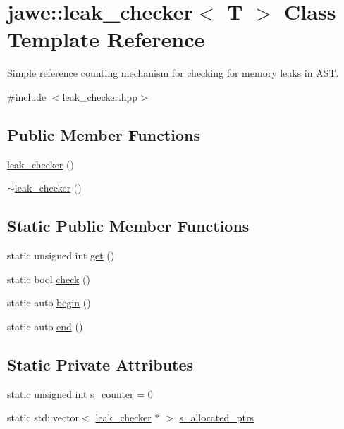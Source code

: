 \hypertarget{classjawe_1_1leak__checker}{}\section{jawe\+:\+:leak\+\_\+checker$<$ T $>$ Class Template Reference}
\label{classjawe_1_1leak__checker}


Simple reference counting mechanism for checking for memory leaks in A\+ST.  




{\ttfamily \#include $<$leak\+\_\+checker.\+hpp$>$}

\subsection*{Public Member Functions}
\begin{DoxyCompactItemize}
\item 
\hyperlink{classjawe_1_1leak__checker_aafd2dc6d0312976fa99fd4b4f364ff8f}{leak\+\_\+checker} ()
\item 
\hyperlink{classjawe_1_1leak__checker_a82dc4d60c3bdbf595794f6fe71c2933a}{$\sim$leak\+\_\+checker} ()
\end{DoxyCompactItemize}
\subsection*{Static Public Member Functions}
\begin{DoxyCompactItemize}
\item 
static unsigned int \hyperlink{classjawe_1_1leak__checker_ab8907095d59ba69847722593aca9010f}{get} ()
\item 
static bool \hyperlink{classjawe_1_1leak__checker_aaa7b847a4c0cf79589c8c66931967992}{check} ()
\item 
static auto \hyperlink{classjawe_1_1leak__checker_aa1b307208670036715f462d0d8cc1b2a}{begin} ()
\item 
static auto \hyperlink{classjawe_1_1leak__checker_a851cc284fe5cafb4a65c397c232f1d62}{end} ()
\end{DoxyCompactItemize}
\subsection*{Static Private Attributes}
\begin{DoxyCompactItemize}
\item 
static unsigned int \hyperlink{classjawe_1_1leak__checker_a19a664431190acd44f4556015d51dce0}{s\+\_\+counter} = 0
\item 
static std\+::vector$<$ \hyperlink{classjawe_1_1leak__checker}{leak\+\_\+checker} $\ast$ $>$ \hyperlink{classjawe_1_1leak__checker_a4c00676a347d0419491927c0f886b101}{s\+\_\+allocated\+\_\+ptrs}
\end{DoxyCompactItemize}


